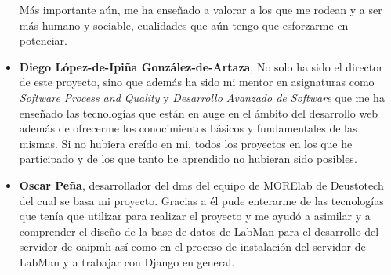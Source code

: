\begin{itemize}
	Más importante aún, me ha enseñado a valorar a los que me rodean y a ser más humano y sociable, cualidades que aún tengo que esforzarme en potenciar.

	\item \textbf{Diego López-de-Ipiña González-de-Artaza}, No solo ha sido el director de este proyecto, sino que además ha sido mi mentor en asignaturas como \textit{Software Process and Quality} y \textit{Desarrollo Avanzado de Software} que me ha enseñado las tecnologías que están en auge en el ámbito del desarrollo web además de ofrecerme los conocimientos básicos y fundamentales de las mismas. Si no hubiera creído en mi, todos los proyectos en los que he participado y de los que tanto he aprendido no hubieran sido posibles.

	\item \textbf{Oscar Peña}, desarrollador del \acrshort{dms} del equipo de MORElab de Deustotech del cual se basa mi proyecto. Gracias a él pude enterarme de las tecnologías que tenía que utilizar para realizar el proyecto y me ayudó a asimilar y a comprender el diseño de la base de datos de LabMan para el desarrollo del servidor de \acrshort{oaipmh} así como en el proceso de instalación del servidor de LabMan y a trabajar con Django en general.

\end{itemize}